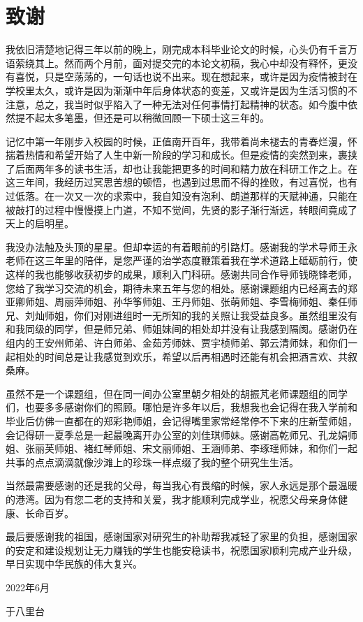 
\chapter*{致谢}
{
	\ttfamily \fontsize{12bp}{16bp}\selectfont
	我依旧清楚地记得三年以前的晚上，刚完成本科毕业论文的时候，心头仍有千言万语萦绕其上。然而两个月前，面对提交完的本论文初稿，我心中却没有释怀，更没有喜悦，只是空荡荡的，一句话也说不出来。现在想起来，或许是因为疫情被封在学校里太久，或许是因为渐渐中年后身体状态的变差，又或许是因为生活习惯的不注意，总之，我当时似乎陷入了一种无法对任何事情打起精神的状态。如今腹中依然提不起太多笔墨，但还是可以稍微回顾一下硕士这三年的。
	
	记忆中第一年刚步入校园的时候，正值南开百年，我带着尚未褪去的青春烂漫，怀揣着热情和希望开始了人生中新一阶段的学习和成长。但是疫情的突然到来，裹挟了后面两年多的读书生活，却也让我能把更多的时间和精力放在科研工作之上。在这三年间，我经历过冥思苦想的顿悟，也遇到过思而不得的挫败，有过喜悦，也有过低落。在一次又一次的求索中，我自知没有泡利、朗道那样的天赋神通，只能在被敲打的过程中慢慢摸上门道，不知不觉间，先贤的影子渐行渐远，转眼间竟成了天上的启明星。
	
	我没办法触及头顶的星星。但却幸运的有着眼前的引路灯。感谢我的学术导师王永老师在这三年里的陪伴，是您严谨的治学态度鞭策着我在学术道路上砥砺前行，使这样的我也能够收获初步的成果，顺利入门科研。感谢共同合作导师钱晓锋老师，您给了我学习交流的机会，期待未来五年与您的相处。感谢课题组内已经离去的郑亚卿师姐、周丽萍师姐、孙华筝师姐、王丹师姐、张萌师姐、李雪梅师姐、秦任师兄、刘灿师姐，你们对刚进组时一无所知的我的关照让我受益良多。虽然组里没有和我同级的同学，但是师兄弟、师姐妹间的相处却并没有让我感到隔阂。感谢仍在组内的王安州师弟、许白师弟、金茹芳师妹、贾宇桢师弟、郭云清师妹，和你们一起相处的时间总是让我感觉到欢乐，希望以后再相遇时还能有机会把酒言欢、共叙桑麻。
	
	虽然不是一个课题组，但在同一间办公室里朝夕相处的胡振芃老师课题组的同学们，也要多多感谢你们的照顾。哪怕是许多年以后，我想我也会记得在我入学前和毕业后仿佛一直都在的郑彩艳师姐，会记得嘴里家常经常停不下来的庄新莹师姐，会记得研一夏季总是一起最晚离开办公室的刘佳琪师妹。感谢高乾师兄、孔龙娟师姐、张丽芙师姐、褚红琴师姐、宋文丽师姐、王涵师弟、李琢瑶师妹，和你们一起共事的点点滴滴就像沙滩上的珍珠一样点缀了我的整个研究生生活。
	
	当然最需要感谢的还是我的父母，每当我心有畏缩的时候，家人永远是那个最温暖的港湾。因为有您二老的支持和关爱，我才能顺利完成学业，祝愿父母亲身体健康、长命百岁。
	
	最后要感谢我的祖国，感谢国家对研究生的补助帮我减轻了家里的负担，感谢国家的安定和建设规划让无力赚钱的学生也能安稳读书，祝愿国家顺利完成产业升级，早日实现中华民族的伟大复兴。
	
	\vspace{3em}
	\begin{flushright}
	2022年6月

	于八里台\hspace*{1em}
	\end{flushright}
}